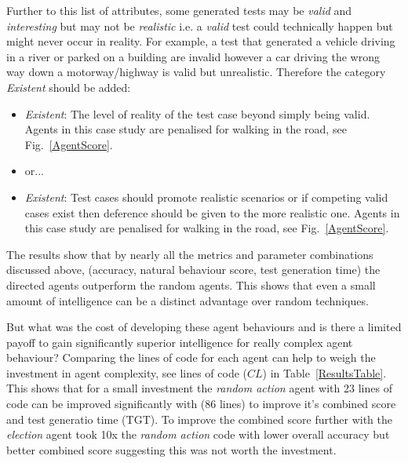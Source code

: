 \documentclass[letterpaper, 10 pt, journal, twoside]{IEEEtran}
\begin{document}
Further to this list of attributes, some generated tests may be \textit{valid} and \textit{interesting} but may not be \textit{realistic} i.e. a \textit{valid} test could technically happen but might never occur in reality. For example, a test that generated a vehicle driving in a river or parked on a building are invalid however a car driving the wrong way down a motorway/highway is valid but unrealistic. %
Therefore the category \textit{Existent} should be added:
\begin{itemize}
	\item \textit{Existent}: The level of reality of the test case beyond simply being valid. Agents in this case study are penalised for walking in the road, see Fig.~\ref{AgentScore}.
	\item or...
	\item \textit{Existent}: Test cases should promote realistic scenarios or if competing valid cases exist then deference should be given to the more realistic one. Agents in this case study are penalised for walking in the road, see Fig.~\ref{AgentScore}.
\end{itemize}


The results show that by nearly all the metrics and parameter combinations discussed above, (accuracy, natural behaviour score, test generation time) the directed agents outperform the random agents. This shows that even a small amount of intelligence can be a distinct advantage over random techniques. 
%

But what was the cost of developing these agent behaviours and is there a limited payoff to gain significantly superior intelligence for really complex agent behaviour? %
%
Comparing the lines of code for each agent can help to weigh the investment in agent complexity, see lines of code ($CL$) in Table~\ref{ResultsTable}. This shows that for a small investment the \textit{random action} agent with 23 lines of code can be improved significantly with (86 lines) to improve it's combined score and test generatio time (TGT). To improve the combined score further with the \textit{election} agent took 10x the \textit{random action} code with lower overall accuracy but better combined score suggesting this was not worth the investment.
\end{document}
